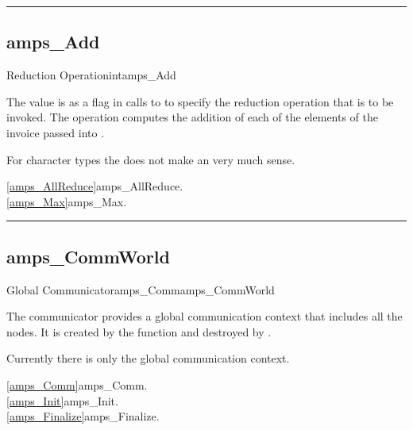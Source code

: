 \noindent\rule{\textwidth}{1mm}

\subsection{amps\_Add}
\label{amps_Add}

\begin{deftypevr}{Reduction Operation}{int}{amps\_Add}
\DESCRIPTION

The  value is as a flag in calls to  to 
specify the reduction operation that is to be invoked.  The 
operation computes the addition of each of the elements of the
invoice passed into .  

\NOTES
For character types the  does not make an very much
sense.

\SEEALSO
\vref{amps_AllReduce}{amps\_AllReduce}. \\
\vref{amps_Max}{amps\_Max}. \\

\end{deftypevr}


\noindent\rule{\textwidth}{1mm}

\subsection{amps\_CommWorld}
\label{amps_CommWorld}

\begin{deftypevr}{Global Communicator}{amps_Comm}{amps\_CommWorld}

\DESCRIPTION

The  communicator provides a global communication
context that includes all the nodes.  It is created by the
 function and destroyed by .

\NOTES
Currently there is only the global communication context. 

\SEEALSO
\vref{amps_Comm}{amps\_Comm}. \\
\vref{amps_Init}{amps\_Init}. \\
\vref{amps_Finalize}{amps\_Finalize}. \\

\end{deftypevr}

